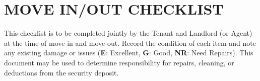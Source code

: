 
\section*{\centering MOVE IN/OUT CHECKLIST}

This checklist is to be completed jointly by the Tenant and Landlord (or Agent) at the time of move-in and move-out.  
Record the condition of each item and note any existing damage or issues (\textbf{E}: Excellent, \textbf{G}: Good, \textbf{NR}: Need Repairs).  
This document may be used to determine responsibility for repairs, cleaning, or deductions from the security deposit.

